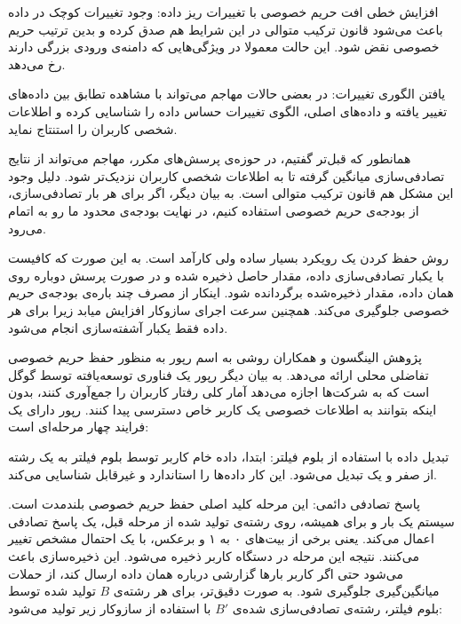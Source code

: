  افزایش خطی افت حریم خصوصی با تغییرات ریز داده: وجود تغییرات کوچک در داده باعث می‌شود قانون ترکیب متوالی در این شرایط هم صدق کرده و بدین ترتیب حریم خصوصی نقض شود. این حالت معمولا در ویژگی‌هایی که دامنه‌ی ورودی بزرگی دارند رخ می‌دهد.

 یافتن الگوری تغییرات: در بعضی حالات مهاجم می‌تواند با مشاهده تطابق بین داده‌های تغییر یافته و داده‌های اصلی، الگوی تغییرات حساس داده را شناسایی کرده و اطلاعات شخصی کاربران را استنتاج نماید.




همانطور که قبل‌تر گفتیم، در حوزه‌ی پرسش‌های مکرر، مهاجم می‌تواند از نتایج تصادفی‌سازی میانگین گرفته تا به اطلاعات شخصی کاربران نزدیک‌تر شود. دلیل وجود این مشکل هم قانون ترکیب متوالی است. به بیان دیگر، اگر برای هر بار تصادفی‌سازی، از بودجه‌ی حریم خصوصی استفاده کنیم، در نهایت بودجه‌ی محدود ما رو به اتمام می‌رود.

روش حفظ کردن یک رویکرد بسیار ساده ولی کارآمد است. به این صورت که کافیست با یکبار تصادفی‌سازی داده، مقدار حاصل ذخیره شده و در صورت پرسش دوباره روی همان داده، مقدار ذخیره‌شده برگردانده شود. اینکار از مصرف چند باره‌ی بودجه‌ی حریم خصوصی جلوگیری می‌کند. همچنین سرعت اجرای سازوکار افزایش میابد زیرا برای هر داده فقط یکبار آشفته‌سازی انجام می‌شود.


پژوهش الینگسون و همکاران روشی به اسم رپور به منظور حفظ حریم خصوصی تفاضلی محلی ارائه می‌دهد. به بیان دیگر رپور یک فناوری توسعه‌یافته توسط گوگل است که به شرکت‌ها اجازه می‌دهد آمار کلی رفتار کاربران را جمع‌آوری کنند، بدون اینکه بتوانند به اطلاعات خصوصی یک کاربر خاص دسترسی پیدا کنند. رپور دارای یک فرایند چهار مرحله‌ای است: 


 تبدیل داده با استفاده از بلوم فیلتر: ابتدا، داده خام کاربر توسط بلوم فیلتر به یک رشته از صفر و یک تبدیل می‌شود. این کار داده‌ها را استاندارد و غیرقابل شناسایی می‌کند.

 پاسخ تصادفی دائمی:  این مرحله کلید اصلی حفظ حریم خصوصی بلندمدت است. سیستم یک بار و برای همیشه، روی رشته‌ی تولید شده از مرحله قبل، یک پاسخ تصادفی اعمال می‌کند. یعنی برخی از بیت‌های ۰ به ۱ و برعکس، با یک احتمال مشخص تغییر می‌کنند. نتیجه این مرحله در دستگاه کاربر ذخیره می‌شود. این ذخیره‌سازی باعث می‌شود حتی اگر کاربر بارها گزارشی درباره همان داده ارسال کند، از حملات میانگین‌گیری جلوگیری شود. به صورت دقیق‌تر، برای هر رشته‌ی $B$ تولید شده توسط بلوم فیلتر، رشته‌ی تصادفی‌سازی شده‌ی $B'$ با استفاده از سازوکار زیر تولید می‌شود:

